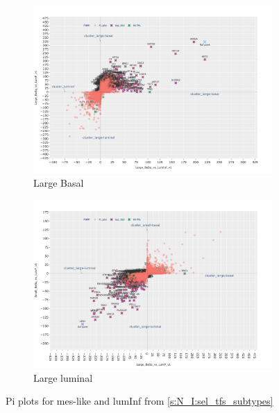 \begin{figure}[!h]
    \centering
    \begin{subfigure}[!t]{1.0\linewidth}
        \includegraphics[width=\textwidth,keepaspectratio]{Sections/Network_I/Resources/selective_pruning/pi_gsea/pi_largeBasal.png}
        \caption{Large Basal}
        \label{fig:ap:pi_basal}
    \end{subfigure}
    \begin{subfigure}[!t]{1.0\textwidth}
        \includegraphics[width=\textwidth,keepaspectratio]{Sections/Network_I/Resources/selective_pruning/pi_gsea/pi_largeLuminal.png}
        \caption{Large luminal}
        \label{fig:ap:pi_lum}
    \end{subfigure}
    \caption{Pi plots for mes-like and lumInf from \cref{s:N_I:sel_tfs_subtypes}}
    \label{fig:ap:pi_other_values_I}
\end{figure}

